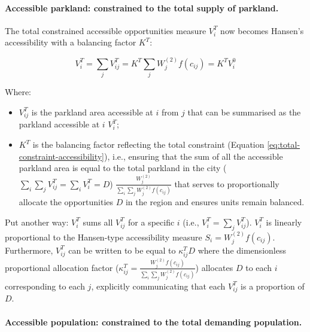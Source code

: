 \documentclass[
11pt, %
oneside, %
english, %
singlespacing, %
]{macthesis} %
\def\tightlist{}
\begin{document}
\paragraph{Accessible parkland: constrained to the total supply of parkland.}\label{accessible-parkland-constrained-to-the-total-supply-of-parkland.}

The total constrained accessible opportunities measure \(V^T_{i}\) now becomes Hansen's accessibility with a balancing factor \(K^T\):

\begin{equation}
\label{eq:total-constrained-accessibility-park}
V^T_i = \sum_j V^T_{ij} = K^T \sum_j W^{(2)}_j f(c_{ij}) = K^T V^0_i
\end{equation} 

Where:

\begin{itemize}
\tightlist
\item
  \(V^T_{ij}\) is the parkland area accessible at \(i\) from \(j\) that can be summarised as the parkland accessible at \(i\) \(V^T_{i}\);
\item
  \(K^T\) is the balancing factor reflecting the total constraint (Equation \ref{eq:total-constraint-accessibility}), i.e., ensuring that the sum of all the accessible parkland area is equal to the total parkland in the city (\(\sum_i\sum_j V^T_{ij} = \sum_i V^T_{i} = D\)) \(\frac{W^{(2)}_j}{\sum_i\sum_j W^{(2)}_jf(c_{ij})}\) that serves to proportionally allocate the opportunities \(D\) in the region and ensures units remain balanced.
\end{itemize}

Put another way: \(V^T_i\) sums all \(V^T_{ij}\) for a specific \(i\) (i.e., \(V^T_i = \sum_j V^T_{ij}\)). \(V^T_i\) is linearly proportional to the Hansen-type accessibility measure \(S_i = W^{(2)}_jf(c_{ij})\). Furthermore, \(V_{ij}^T\) can be written to be equal to \(\kappa_{ij}^T D\) where the dimensionless proportional allocation factor (\(\kappa_{ij}^T = \frac{W_j^{(2)} f(c_{ij})}{\sum_i\sum_j W^{(2)}_jf(c_{ij})}\)) allocates \(D\) to each \(i\) corresponding to each \(j\), explicitly communicating that each \(V_{ij}^T\) is a proportion of \(D\).

\paragraph{Accessible population: constrained to the total demanding population.}\label{accessible-population-constrained-to-the-total-demanding-population.}
\end{document}
